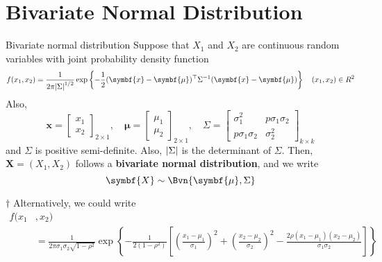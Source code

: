 \section{Bivariate Normal Distribution}
\begin{Definition}{Bivariate normal distribution}{}
    Suppose that $ X_1 $ and $ X_2 $
    are continuous random variables with joint probability
    density function
    \[ f(x_1,x_2)=\frac{1}{2\pi\abs*{\Sigma}^{1/2}}
        \exp\left\{ -\frac{1}{2}(\symbf{x}-\symbf{\mu})^\top \Sigma^{-1}(\symbf{x}-\symbf{\mu})
        \right\}\quad(x_1,x_2)\in\mathbb{R}^2     \]
    Also,
    \[ \symbf{x}=\begin{bmatrix}
            x_1 \\
            x_2
        \end{bmatrix}_{2\times 1},\quad
        \symbf{\mu}=\begin{bmatrix}
            \mu_1 \\
            \mu_2
        \end{bmatrix}_{2\times 1},\quad
        \Sigma=
        \begin{bmatrix}
            \sigma_1^2        & p\sigma_1\sigma_2 \\
            p\sigma_1\sigma_2 & \sigma_2^2
        \end{bmatrix}_{k\times k} \]
    and $ \Sigma $ is positive semi-definite. Also,
    $ \abs*{\Sigma} $ is the determinant of $ \Sigma $.
    Then, $ \symbf{X}=(X_1,X_2) $ follows a \textbf{bivariate normal distribution},
    and we write
    \[ \symbf{X}\sim\Bvn{\symbf{\mu},\Sigma}  \]
\end{Definition}
\begin{Remark}{$ \dagger $}{}
    Alternatively, we could write
    \begin{align*}
        f(x_1 & ,x_2)                                          \\
              & =\frac{1}{2\pi\sigma_1\sigma_2\sqrt{1-\rho^2}}
        \exp\left\{ -\frac{1}{2(1-\rho^2)}
        \left[ \left( \frac{x_1-\mu_1}{\sigma_1}  \right)^2+
            \left( \frac{x_2-\mu_2}{\sigma_2}  \right)^2-
            \frac{2\rho(x_1-\mu_1)(x_2-\mu_2)}{\sigma_1\sigma_2} \right] \right\}
    \end{align*}
\end{Remark}
